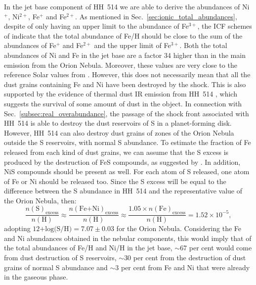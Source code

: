\documentclass[fleqn,usenatbib]{mnras}
\begin{document}
In the jet base component of HH~514 we are able to derive the abundances of Ni$^{+}$, Ni$^{2+}$, Fe$^{+}$ and Fe$^{2+}$. As mentioned in Sec.~\ref{sec:ionic_total_abundances}, despite of only having an upper limit to the abundance of Fe$^{3+}$, the ICF schemes of \citet{rodriguez05} indicate that the total abundance of Fe/H should be close to the sum of the abundances of Fe$^{+}$ and Fe$^{2+}$ and the upper limit of Fe$^{3+}$. Both the total abundances of Ni and Fe in the jet base are a factor 34 higher than in the main emission from the Orion Nebula. Moreover, these values are very close to the reference Solar values from \citet{lodders19}. However, this does not necessarily mean that all the dust grains containing Fe and Ni have been destroyed by the shock. This is also supported by the evidence of thermal dust IR emission from HH~514 \citep{smith05}, which suggests the survival of some amount of dust in the object. In connection with Sec.~\ref{subsec:real_overabundance}, the passage of the shock front associated with HH~514 is able to destroy the dust reservoirs of S in a planet-forming disk. However, HH~514 can also destroy dust grains of zones of the Orion Nebula outside the S  reservoirs, with normal S abundance. To estimate the fraction of Fe released from each kind of dust grains, we can assume that the S excess is produced by the destruction of FeS compounds, as suggested by \citet{Kama19}. In addition, NiS compounds should be present as well. For each atom of S released, one atom of Fe or Ni should be released too. Since the S excess will be equal to the difference between the S abundance in HH~514 and the representative value of the Orion Nebula, then:
\begin{equation*}
    \frac{n(\text{S})_{\text{excess}}}{n(\text{H})}\approx\frac{n(\text{Fe+Ni})_{\text{excess}}}{n(\text{H})}\approx\frac{1.05\times n(\text{Fe})_{\text{excess}}}{n(\text{H})}=1.52\times 10^{-5},
\end{equation*}
adopting $\text{12+log(S/H)}=7.07 \pm 0.03$ \citep{mendez2021-2} for the Orion Nebula. Considering the Fe and Ni abundances obtained in the nebular components, this would imply that of the total abundances of Fe/H and Ni/H in the jet base, $\sim$67 per cent would come from dust destruction of S reservoirs, $\sim$30 per cent from the destruction of dust grains of normal S abundance and $\sim$3 per cent from Fe and Ni that were already in the gaseous phase. %
\end{document}
